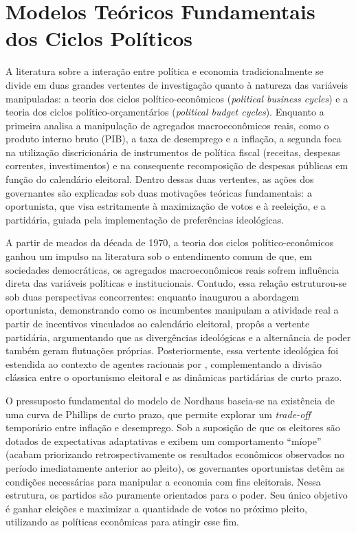 \chapter{Modelos Teóricos Fundamentais dos Ciclos Políticos}\label{cap:modelos}

A literatura sobre a interação entre política e economia tradicionalmente se divide em duas grandes vertentes de investigação quanto à natureza das variáveis manipuladas: a teoria dos ciclos político-econômicos (\textit{political business cycles}) e a teoria dos ciclos político-orçamentários (\textit{political budget cycles}). Enquanto a primeira analisa a manipulação de agregados macroeconômicos reais, como o produto interno bruto (PIB), a taxa de desemprego e a inflação, a segunda foca na utilização discricionária de instrumentos de política fiscal (receitas, despesas correntes, investimentos) e na consequente recomposição de despesas públicas em função do calendário eleitoral. Dentro dessas duas vertentes, as ações dos governantes são explicadas sob duas motivações teóricas fundamentais: a oportunista, que visa estritamente à maximização de votos e à reeleição, e a partidária, guiada pela implementação de preferências ideológicas. 

A partir de meados da década de 1970, a teoria dos ciclos político-econômicos ganhou um impulso na literatura sob o entendimento comum de que, em sociedades democráticas, os agregados macroeconômicos reais sofrem influência direta das variáveis políticas e institucionais. Contudo, essa relação estruturou-se sob duas perspectivas concorrentes: enquanto \textcite{nordhaus1975} inaugurou a abordagem oportunista, demonstrando como os incumbentes manipulam a atividade real a partir de incentivos vinculados ao calendário eleitoral, \textcite{hibbs1977} propôs a vertente partidária, argumentando que as divergências ideológicas e a alternância de poder também geram flutuações próprias. Posteriormente, essa vertente ideológica foi estendida ao contexto de agentes racionais por \textcite{alesina1987}, complementando a divisão clássica entre o oportunismo eleitoral e as dinâmicas partidárias de curto prazo.

O pressuposto fundamental do modelo de Nordhaus baseia-se na existência de uma curva de Phillips de curto prazo, que permite explorar um \textit{trade-off} temporário entre inflação e desemprego. Sob a suposição de que os eleitores são dotados de expectativas adaptativas e exibem um comportamento ``míope'' (acabam priorizando retrospectivamente os resultados econômicos observados no período imediatamente anterior ao pleito), os governantes oportunistas detêm as condições necessárias para manipular a economia com fins eleitorais. Nessa estrutura, os partidos são puramente orientados para o poder. Seu único objetivo é ganhar eleições e maximizar a quantidade de votos no próximo pleito, utilizando as políticas econômicas para atingir esse fim.

